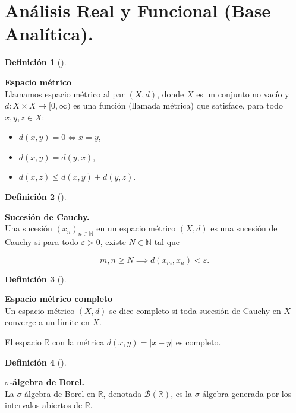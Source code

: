 \documentclass[
  spanish,
  us-letterpaper,
]{scrreprt}
\theoremstyle{plain}
\theoremstyle{plain}
\theoremstyle{plain}
\theoremstyle{definition}
\newtheorem{definition}{Definición}[chapter]
\theoremstyle{remark}
\begin{document}
\section{Análisis Real y Funcional (Base
Analítica).}\label{anuxe1lisis-real-y-funcional-base-analuxedtica.}

\begin{definition}[]\protect\hypertarget{def-espacio_metrico}{}\label{def-espacio_metrico}

\textbf{Espacio métrico}\\
Llamamos espacio métrico al par \((X, d)\), donde \(X\) es un conjunto
no vacío y \(d: X \times X \to [0, \infty)\) es una función (llamada
métrica) que satisface, para todo \(x, y, z \in X\):

\begin{itemize}
\item
  \(d(x, y) = 0 \iff x = y\),
\item
  \(d(x, y) = d(y, x)\),
\item
  \(d(x, z) \leq d(x, y) + d(y, z)\).
\end{itemize}

\end{definition}

\begin{definition}[]\protect\hypertarget{def-sucesion_cauchy}{}\label{def-sucesion_cauchy}

\textbf{Sucesión de Cauchy.}\\
Una sucesión \((x_n)_{n \in \mathbb{N}}\) en un espacio métrico
\((X, d)\) es una sucesión de Cauchy si para todo \(\varepsilon > 0\),
existe \(N \in \mathbb{N}\) tal que

\[
m, n \geq N \implies d(x_m, x_n) < \varepsilon.
\]

\end{definition}

\begin{definition}[]\protect\hypertarget{def-esp_metrico_comp}{}\label{def-esp_metrico_comp}

\textbf{Espacio métrico completo}\\
Un espacio métrico \((X, d)\) se dice completo si toda sucesión de
Cauchy en \(X\) converge a un límite en \(X\).

\end{definition}

El espacio \(\mathbb{R}\) con la métrica \(d(x, y) = |x - y|\) es
completo.

\begin{definition}[]\protect\hypertarget{def-sigma_algebra}{}\label{def-sigma_algebra}

\textbf{\(\sigma\)-álgebra de Borel.}\\
La \(\sigma\)-álgebra de Borel en \(\mathbb{R}\), denotada
\(\mathcal{B}(\mathbb{R})\), es la \(\sigma\)-álgebra generada por los
intervalos abiertos de \(\mathbb{R}\).

\end{definition}
\end{document}

